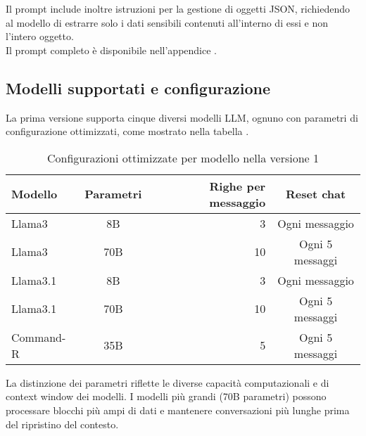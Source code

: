 \documentclass[12pt]{report}
\begin{document}
Il prompt include inoltre istruzioni per la gestione di oggetti JSON, richiedendo al modello di estrarre solo i dati sensibili contenuti all'interno di essi e non l'intero oggetto. \\
Il prompt completo è disponibile nell'appendice .

\subsection{Modelli supportati e configurazione}
\label{subsec:ver1_modelli_supportati}

La prima versione supporta cinque diversi modelli LLM, ognuno con parametri di configurazione ottimizzati, come mostrato nella tabella .

\begin{table}[h!]
    \centering
    \begin{tabular}{|l|c|r|c|}
        \hline
        \textbf{Modello} & \textbf{Parametri} & \textbf{Righe per messaggio} & \textbf{Reset chat} \\ \hline
        Llama3           & 8B                 & 3                            & Ogni messaggio      \\ \hline
        Llama3           & 70B                & 10                           & Ogni 5 messaggi     \\ \hline
        Llama3.1         & 8B                 & 3                            & Ogni messaggio      \\ \hline
        Llama3.1         & 70B                & 10                           & Ogni 5 messaggi     \\ \hline
        Command-R        & 35B                & 5                            & Ogni 5 messaggi     \\ \hline
    \end{tabular}
    \caption{Configurazioni ottimizzate per modello nella versione 1}
    \label{tab:modelli_llm_ver1}
\end{table}


La distinzione dei parametri riflette le diverse capacità computazionali e di context window dei modelli. I modelli più grandi (70B parametri) possono processare blocchi più ampi di dati e mantenere conversazioni più lunghe prima del ripristino del contesto.
\end{document}
